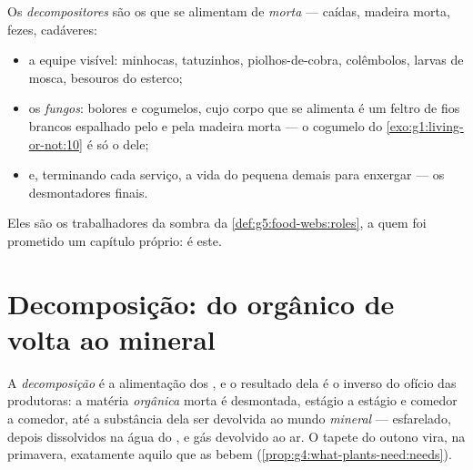 \begin{definition}[Decompositores]\label{def:g6:decomposers-and-soil:decomposers}
Os \emph{decompositores} são os  que se
alimentam de \emph{ morta} ---  caídas, madeira
morta, fezes, cadáveres:
\begin{itemize}
  \item a equipe visível: minhocas, tatuzinhos, piolhos-de-cobra,
        colêmbolos, larvas de mosca, besouros do esterco;
  \item os \emph{fungos}: bolores e cogumelos, cujo corpo
        que se alimenta é um feltro de fios brancos espalhado pelo
         e pela madeira morta --- o cogumelo do
        \cref{exo:g1:living-or-not:10} é só o  dele;
  \item e, terminando cada serviço, a vida do  pequena demais
        para enxergar --- os desmontadores finais.
\end{itemize}
Eles são os trabalhadores da sombra da
\cref{def:g5:food-webs:roles}, a quem foi prometido um capítulo
próprio: é este.
\end{definition}

\section{Decomposição: do orgânico de volta ao mineral}

\begin{proposition}\label{prop:g6:decomposers-and-soil:decomposition}
A \emph{decomposição} é a alimentação dos
, e o resultado dela é o inverso do ofício das
produtoras: a matéria \emph{orgânica} morta é desmontada, estágio a
estágio e comedor a comedor, até a substância dela ser devolvida ao
mundo \emph{mineral} ---  esfarelado, depois 
dissolvidos na água do , e gás devolvido ao ar. O tapete do outono
vira, na primavera, exatamente aquilo que as  bebem
(\cref{prop:g4:what-plants-need:needs}).
\end{proposition}
\admitted

